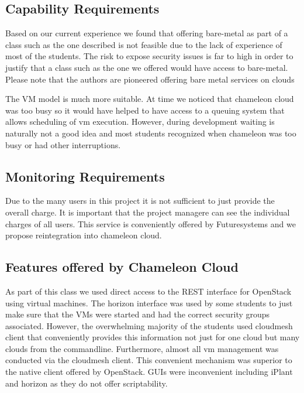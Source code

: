 \documentclass[sigconf]{acmart}
\begin{document}
\subsection{Capability Requirements}

Based on our current experience we found that offering bare-metal as part of a
class such as the one described is not feasible due to the lack of
experience of most of the students. The risk to expose security issues
is far to high in order to justify that a class such as the one we
offered would have access to bare-metal. Please note that the authors
are pioneered offering bare metal services on clouds \cite{las08federated-cloud}


The VM model is much more
suitable. At time we noticed that chameleon cloud was too busy so it
would have helped to have access to a queuing system that allows
scheduling of vm execution. However, during development waiting is
naturally not a good idea and most students recognized when chameleon
was too busy or had other interruptions.

\subsection{Monitoring Requirements}

Due to the many users in this project it is not sufficient to just
provide the overall charge. It is important that the project managere
can see the individual charges of all users. This service is
conveniently offered by Futuresystems and we propose reintegration
into chameleon cloud.

\subsection{Features offered by Chameleon Cloud}

As part of this class we used direct access to the REST interface for
OpenStack using virtual machines. The horizon interface was used by
some students to just make sure that the VMs were started and had the
correct security groups associated. However, the overwhelming majority
of the students used cloudmesh client that conveniently provides this
information not just for one cloud but many clouds from the
commandline. Furthermore, almost all vm management was conducted via
the cloudmesh client. This convenient mechanism was superior to the
native client offered by OpenStack. GUIs were inconvenient including
iPlant and horizon as they do not offer scriptability.
\end{document}
